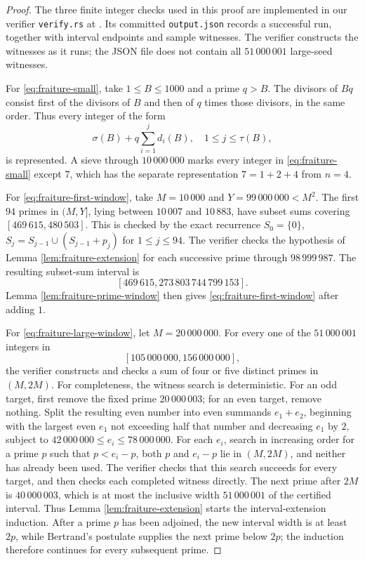 \documentclass[11pt,letterpaper,reqno]{amsart}
\numberwithin{equation}{section}
\theoremstyle{remark}
\newcommand{\1}{\mathbf 1}
\renewcommand{\leq}{\leqslant}
\begin{document}
\begin{proof}
The three finite integer checks used in this proof are implemented in
our verifier \texttt{verify.rs} at \cite{FraitureVerifier}. Its committed \texttt{output.json} records a successful
run, together with interval endpoints and sample witnesses. The verifier
constructs the witnesses as it runs; the JSON file does not contain all
$51\,000\,001$ large-seed witnesses.

For \eqref{eq:fraiture-small}, take $1\leq B\leq1000$ and a prime $q>B$.
The divisors of $Bq$ consist first of the divisors of $B$ and then of $q$
times those divisors, in the same order. Thus every integer of the form
\[
 \sigma(B)+q\sum_{i=1}^j d_i(B),
 \quad 1\leq j\leq\tau(B),
\]
is represented. A sieve through $10\,000\,000$ marks every integer in
\eqref{eq:fraiture-small} except $7$, which has the separate
representation $7=1+2+4$ from $n=4$.

For \eqref{eq:fraiture-first-window}, take $M=10\,000$ and
$Y=99\,000\,000<M^2$. The first $94$ primes in $(M,Y]$, lying between
$10\,007$ and $10\,883$, have subset sums covering
$[469\,615,480\,503]$. This is checked by the exact recurrence
$S_0=\{0\}$, $S_j=S_{j-1}\cup(S_{j-1}+p_j)$ for $1\leq j\leq94$.
The verifier checks the hypothesis of
Lemma \ref{lem:fraiture-extension} for each successive prime through
$98\,999\,987$. The resulting subset-sum interval is
\[
 [469\,615,273\,803\,744\,799\,153].
\]
Lemma \ref{lem:fraiture-prime-window} then gives
\eqref{eq:fraiture-first-window} after adding $1$.

For \eqref{eq:fraiture-large-window}, let $M=20\,000\,000$.
For every one of the $51\,000\,001$ integers in
\[
 [105\,000\,000,156\,000\,000],
\]
the verifier constructs and checks a sum of four or five distinct primes
in $(M,2M)$. For completeness, the witness search is deterministic.
For an odd target, first remove the fixed prime $20\,000\,003$;
for an even target, remove nothing. Split the resulting even number into
even summands $e_1+e_2$, beginning with the largest even $e_1$ not exceeding
half that number and decreasing $e_1$ by $2$, subject to
$42\,000\,000\leq e_i\leq78\,000\,000$.
For each $e_i$, search in increasing order for a prime $p$ such that
$p<e_i-p$, both $p$ and $e_i-p$ lie in $(M,2M)$, and neither has already
been used. The verifier checks that this search succeeds for every target,
and then checks each completed witness directly.
The next prime after $2M$ is $40\,000\,003$, which is at
most the inclusive width $51\,000\,001$ of the certified interval. Thus
Lemma \ref{lem:fraiture-extension} starts the interval-extension
induction. After a prime $p$ has been adjoined, the new interval width is
at least $2p$, while Bertrand's postulate supplies the next prime below
$2p$; the induction therefore continues for every subsequent prime.


\end{proof}
\end{document}
